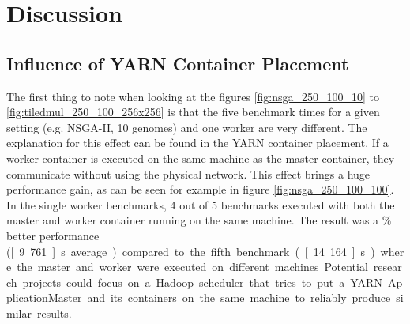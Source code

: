

\section{Discussion}
\label{chap:evaluation:discussion}

\subsection{Influence of YARN Container Placement}
The first thing to note when looking at the figures \ref{fig:nsga_250_100_10} to \ref{fig:tiledmul_250_100_256x256} is that the five benchmark times for a given setting (e.g. NSGA-II, 10 genomes) and one worker are very different. The explanation for this effect can be found in the YARN container placement. If a worker container is executed on the same machine as the master container, they communicate without using the physical network. This effect brings a huge performance gain, as can be seen for example in figure \ref{fig:nsga_250_100_100}. In the single worker benchmarks, 4 out of 5 benchmarks executed with both the master and worker container running on the same machine. The result was a \unit[50]{\%} better performance (\unit[9.761]{s} average) compared to the fifth benchmark (\unit[14.164]{s}) where the master and worker were executed on different machines. Potential research projects could focus on a Hadoop scheduler that tries to put a YARN ApplicationMaster and its containers on the same machine to reliably produce similar results.

